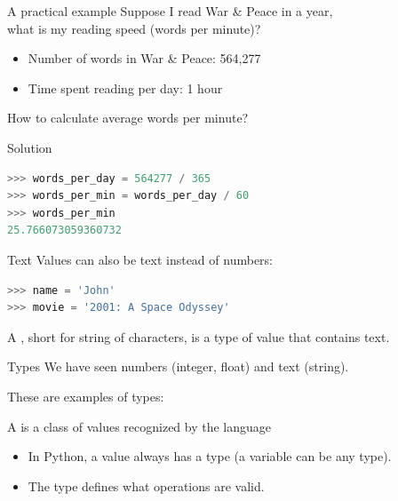 \documentclass[aspectratio=169,usenames,dvipsnames]{beamer}
\begin{document}
\begin{frame}{A practical example}
    Suppose I read War \& Peace in a year, \\
    what is my reading speed (words per minute)?
    \begin{itemize}
        \item Number of words in War \& Peace: 564,277
        \item Time spent reading per day: 1 hour
    \end{itemize}
    How to calculate average words per minute?
\end{frame}

\begin{frame}[fragile]{Solution}
\begin{lstlisting}[language=python]
>>> words_per_day = 564277 / 365
>>> words_per_min = words_per_day / 60
>>> words_per_min
25.766073059360732
\end{lstlisting}
\end{frame}


\begin{frame}[fragile]{Text}
Values can also be text instead of numbers:
\begin{lstlisting}[language=python]
>>> name = 'John'
>>> movie = '2001: A Space Odyssey'
\end{lstlisting}

\pause
    \begin{definition}
        A , short for string of characters,
        is a type of value that contains text.
    \end{definition}
\end{frame}

\begin{frame}{Types}
    We have seen numbers (integer, float) and text (string).

    These are examples of types:

    \begin{definition}
        A  is a class of values recognized by the language
    \end{definition}
    
    \pause
    \begin{itemize}
        \item In Python, a value always has a type (a variable can be any type).
        \item The type defines what operations are valid.
    \end{itemize}
\end{frame}
\end{document}
